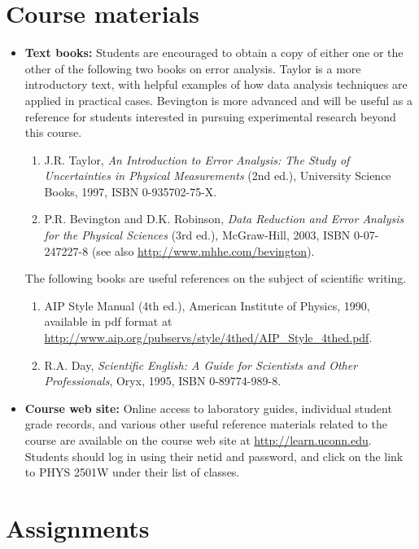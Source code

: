 \documentclass{revtex4}
\begin{document}
\section{Course materials}

\begin{itemize}
\item
{\bf Text books:} Students are encouraged to obtain a copy of either one or
the other of the following two books on error analysis. Taylor is a more
introductory text, with helpful examples of how data analysis techniques
are applied in practical cases. Bevington is more advanced and will be useful
as a reference for students interested in pursuing experimental research
beyond this course.
\begin{enumerate}
\item
J.R. Taylor, {\it An Introduction to Error Analysis: The Study of Uncertainties
in Physical Measurements} (2nd ed.), University Science Books, 1997, 
ISBN 0-935702-75-X.
\item
P.R. Bevington and D.K. Robinson, {\it Data Reduction and Error Analysis for
the Physical Sciences} (3rd ed.), McGraw-Hill, 2003, ISBN 0-07-247227-8 
(see also \url{http://www.mhhe.com/bevington}).
\end{enumerate}
The following books are useful references on the subject of scientific writing.
\begin{enumerate}
\item
{AIP Style Manual} (4th ed.), American Institute of Physics, 1990, available
in pdf format at \url{http://www.aip.org/pubservs/style/4thed/AIP_Style_4thed.pdf}.
\item
R.A. Day, {\it Scientific English: A Guide for Scientists and Other 
Professionals}, Oryx, 1995, ISBN 0-89774-989-8.
\end{enumerate}
\item
{\bf Course web site:} Online access to laboratory guides, individual student
grade records, and various other useful reference materials related to the
course are available on the course web site at \url{http://learn.uconn.edu}.
Students should log in using their netid and password, and click on the link
to PHYS 2501W under their list of classes.
\end{itemize}

\section{Assignments}
\end{document}
